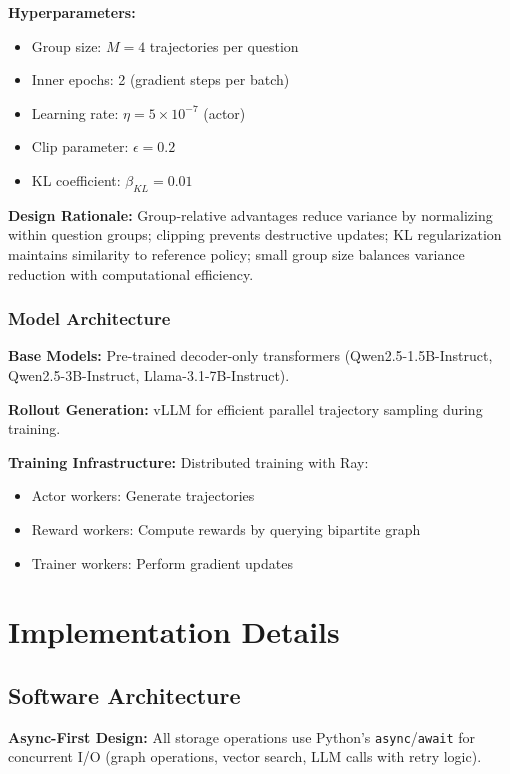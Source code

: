 \documentclass[11pt,a4paper]{article}
\begin{document}
\textbf{Hyperparameters:}
\begin{itemize}
    \item Group size: $M = 4$ trajectories per question
    \item Inner epochs: 2 (gradient steps per batch)
    \item Learning rate: $\eta = 5 \times 10^{-7}$ (actor)
    \item Clip parameter: $\epsilon = 0.2$
    \item KL coefficient: $\beta_{KL} = 0.01$
\end{itemize}

\textbf{Design Rationale:} Group-relative advantages reduce variance by normalizing within question groups; clipping prevents destructive updates; KL regularization maintains similarity to reference policy; small group size balances variance reduction with computational efficiency.

\subsubsection{Model Architecture}

\textbf{Base Models:} Pre-trained decoder-only transformers (Qwen2.5-1.5B-Instruct, Qwen2.5-3B-Instruct, Llama-3.1-7B-Instruct).

\textbf{Rollout Generation:} vLLM for efficient parallel trajectory sampling during training.

\textbf{Training Infrastructure:} Distributed training with Ray:
\begin{itemize}
    \item Actor workers: Generate trajectories
    \item Reward workers: Compute rewards by querying bipartite graph
    \item Trainer workers: Perform gradient updates
\end{itemize}

\section{Implementation Details}

\subsection{Software Architecture}

\textbf{Async-First Design:} All storage operations use Python's \texttt{async}/\texttt{await} for concurrent I/O (graph operations, vector search, LLM calls with retry logic).
\end{document}

